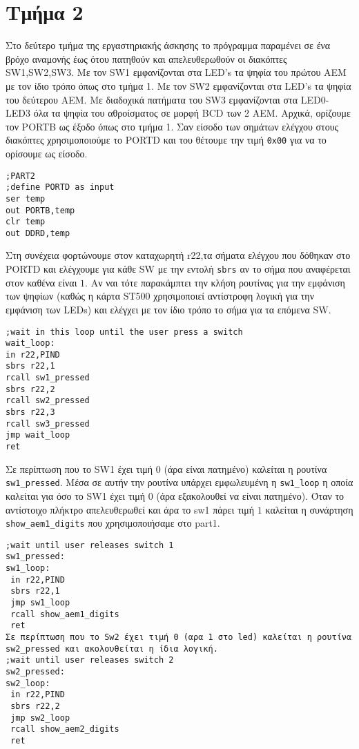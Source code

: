 \chapter{Τμήμα 2}

Στο δεύτερο τμήμα της εργαστηριακής άσκησης το πρόγραμμα παραμένει σε ένα βρόχο αναμονής έως ότου πατηθούν
και απελευθερωθούν οι διακόπτες SW1,SW2,SW3.
Με τον SW1 εμφανίζονται στα LED's τα ψηφία του πρώτου ΑΕΜ με τον ίδιο τρόπο όπως στο τμήμα 1.
Με τον SW2 εμφανίζονται στα LED's τα ψηφία του δεύτερου ΑΕΜ.
Με διαδοχικά πατήματα του SW3 εμφανίζονται στα LED0-LED3 όλα τα ψηφία του αθροίσματος σε μορφή BCD των 2 ΑΕΜ.
Αρχικά, ορίζουμε τον PORTB ως έξοδο όπως στο τμήμα 1.
Σαν είσοδο των σημάτων ελέγχου στους διακόπτες χρησιμοποιούμε το PORTD
και του θέτουμε την τιμή \lstinline!0x00! για να το ορίσουμε ως είσοδο.
\begin{lstlisting}
;PART2
;define PORTD as input
ser temp
out PORTB,temp
clr temp
out DDRD,temp
\end{lstlisting}

Στη συνέχεια φορτώνουμε στον καταχωρητή r22,τα σήματα ελέγχου που δόθηκαν στο PORTD και ελέγχουμε για κάθε SW με την εντολή \lstinline!sbrs!
αν το σήμα που αναφέρεται στον καθένα είναι $1$.
Aν ναι τότε παρακάμπτει την κλήση ρουτίνας για την εμφάνιση των
ψηφίων (καθώς η κάρτα ST500 χρησιμοποιεί αντίστροφη λογική για την
εμφάνιση των LEDs) και ελέγχει με τον ίδιο τρόπο το σήμα για τα επόμενα SW.
\begin{lstlisting}
;wait in this loop until the user press a switch
wait_loop:
in r22,PIND
sbrs r22,1
rcall sw1_pressed
sbrs r22,2
rcall sw2_pressed
sbrs r22,3
rcall sw3_pressed
jmp wait_loop
ret
\end{lstlisting}

Σε περίπτωση που το SW1 έχει τιμή $0$ (άρα είναι πατημένο) καλείται η ρουτίνα \lstinline!sw1_pressed!.
Mέσα σε αυτήν την ρουτίνα υπάρχει εμφωλευμένη η \lstinline!sw1_loop!
η οποία καλείται για όσο το SW1 έχει τιμή 0 (άρα εξακολουθεί να είναι πατημένο).
Όταν το αντίστοιχο πλήκτρο απελευθερωθεί και άρα το sw1 πάρει τιμή $1$
καλείται η συνάρτηση \lstinline!show_aem1_digits! που χρησιμοποιήσαμε στο part1.
\begin{lstlisting}
;wait until user releases switch 1
sw1_pressed:
sw1_loop:
 in r22,PIND
 sbrs r22,1
 jmp sw1_loop
 rcall show_aem1_digits
 ret
Σε περίπτωση που το Sw2 έχει τιμή 0 (αρα 1 στο led) καλείται η ρουτίνα
sw2_pressed και ακολουθείται η ίδια λογική.
;wait until user releases switch 2
sw2_pressed:
sw2_loop:
 in r22,PIND
 sbrs r22,2
 jmp sw2_loop
 rcall show_aem2_digits
 ret
\end{lstlisting}

